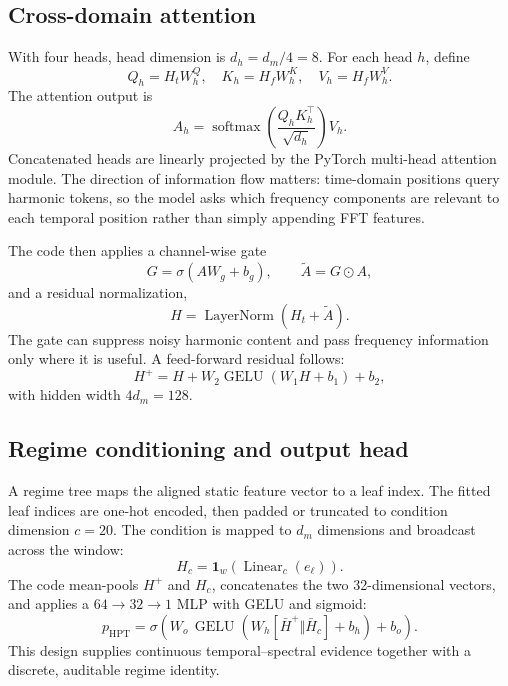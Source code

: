 \documentclass[11pt]{article}
\begin{document}
\subsection{Cross-domain attention}
With four heads, head dimension is $d_h=d_m/4=8$. For each head $h$, define
\begin{equation}
 Q_h=H_tW^Q_h,\quad K_h=H_fW^K_h,\quad V_h=H_fW^V_h.
\end{equation}
The attention output is
\begin{equation}
 A_h=\operatorname{softmax}\left(\frac{Q_hK_h^\top}{\sqrt{d_h}}\right)V_h.
\end{equation}
Concatenated heads are linearly projected by the PyTorch multi-head attention module. The direction of information flow matters: time-domain positions query harmonic tokens, so the model asks which frequency components are relevant to each temporal position rather than simply appending FFT features.

The code then applies a channel-wise gate
\begin{equation}
 G=\sigma(AW_g+b_g),\qquad \widetilde A=G\odot A,
\end{equation}
and a residual normalization,
\begin{equation}
 H=\operatorname{LayerNorm}(H_t+\widetilde A).
\end{equation}
The gate can suppress noisy harmonic content and pass frequency information only where it is useful. A feed-forward residual follows:
\begin{equation}
 H^+=H+W_2\operatorname{GELU}(W_1H+b_1)+b_2,
\end{equation}
with hidden width $4d_m=128$.

\subsection{Regime conditioning and output head}
A regime tree maps the aligned static feature vector to a leaf index. The fitted leaf indices are one-hot encoded, then padded or truncated to condition dimension $c=20$. The condition is mapped to $d_m$ dimensions and broadcast across the window:
\begin{equation}
 H_c=\mathbf{1}_w(\operatorname{Linear}_c(e_\ell)).
\end{equation}
The code mean-pools $H^+$ and $H_c$, concatenates the two 32-dimensional vectors, and applies a $64\to32\to1$ MLP with GELU and sigmoid:
\begin{equation}
 p_{\mathrm{HPT}}=\sigma\left(W_o\,\operatorname{GELU}(W_h[\bar H^+\Vert\bar H_c]+b_h)+b_o\right).
\end{equation}
This design supplies continuous temporal--spectral evidence together with a discrete, auditable regime identity.
\end{document}
